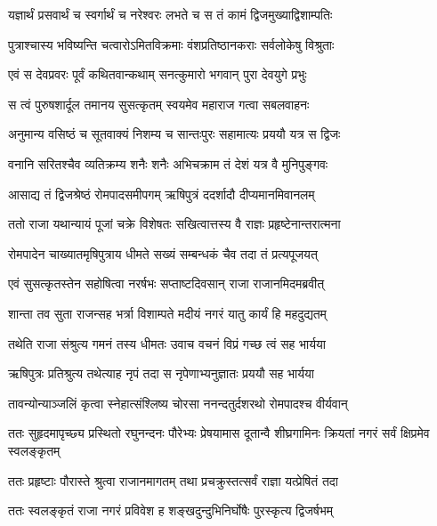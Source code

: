 \twolineshloka
{यज्ञार्थं प्रसवार्थं च स्वर्गार्थं च नरेश्वरः}
{लभते च स तं कामं द्विजमुख्याद्विशाम्पतिः} %

\twolineshloka
{पुत्राश्चास्य भविष्यन्ति चत्वारोऽमितविक्रमाः}
{वंशप्रतिष्ठानकराः सर्वलोकेषु विश्रुताः} %

\twolineshloka
{एवं स देवप्रवरः पूर्वं कथितवान्कथाम्}
{सनत्कुमारो भगवान् पुरा देवयुगे प्रभुः} %

\twolineshloka
{स त्वं पुरुषशार्दूल तमानय सुसत्कृतम्}
{स्वयमेव महाराज गत्वा सबलवाहनः} %

\twolineshloka
{अनुमान्य वसिष्ठं च सूतवाक्यं निशम्य च}
{सान्तःपुरः सहामात्यः प्रययौ यत्र स द्विजः} %

\twolineshloka
{वनानि सरितश्चैव व्यतिक्रम्य शनैः शनैः}
{अभिचक्राम तं देशं यत्र वै मुनिपुङ्गवः} %

\twolineshloka
{आसाद्य तं द्विजश्रेष्ठं रोमपादसमीपगम्}
{ऋषिपुत्रं ददर्शादौ दीप्यमानमिवानलम्} %

\twolineshloka
{ततो राजा यथान्यायं पूजां चक्रे विशेषतः}
{सखित्वात्तस्य वै राज्ञः प्रहृष्टेनान्तरात्मना} %

\twolineshloka
{रोमपादेन चाख्यातमृषिपुत्राय धीमते}
{सख्यं सम्बन्धकं चैव तदा तं प्रत्यपूजयत्} %

\twolineshloka
{एवं सुसत्कृतस्तेन सहोषित्वा नरर्षभः}
{सप्ताष्टदिवसान् राजा राजानमिदमब्रवीत्} %

\twolineshloka
{शान्ता तव सुता राजन्सह भर्त्रा विशाम्पते}
{मदीयं नगरं यातु कार्यं हि महदुद्यतम्} %

\twolineshloka
{तथेति राजा संश्रुत्य गमनं तस्य धीमतः}
{उवाच वचनं विप्रं गच्छ त्वं सह भार्यया} %

\twolineshloka
{ऋषिपुत्रः प्रतिश्रुत्य तथेत्याह नृपं तदा}
{स नृपेणाभ्यनुज्ञातः प्रययौ सह भार्यया} %

\twolineshloka
{तावन्योन्याञ्जलिं कृत्वा स्नेहात्संश्लिष्य चोरसा}
{ननन्दतुर्दशरथो रोमपादश्च वीर्यवान्} %

\threelineshloka
{ततः सुहृदमापृच्छ्य प्रस्थितो रघुनन्दनः}
{पौरेभ्यः प्रेषयामास दूतान्वै शीघ्रगामिनः}
{क्रियतां नगरं सर्वं क्षिप्रमेव स्वलङ्कृतम्} %

\twolineshloka
{ततः प्रहृष्टाः पौरास्ते श्रुत्वा राजानमागतम्}
{तथा प्रचक्रुस्तत्सर्वं राज्ञा यत्प्रेषितं तदा} %

\twolineshloka
{ततः स्वलङ्कृतं राजा नगरं प्रविवेश ह}
{शङ्खदुन्दुभिनिर्घोषैः पुरस्कृत्य द्विजर्षभम्} %

